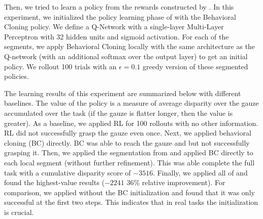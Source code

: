 Then, we tried to learn a policy from the rewards constructed by \hirl.
In this experiment, we initialized the policy learning phase of \hirl with the Behavioral Cloning policy.
We define a Q-Network with a single-layer Multi-Layer Perceptron with 32 hidden units and sigmoid activation.
For each of the segments, we apply Behavioral Cloning locally with the same architecture as the Q-network (with an additional softmax over the output layer) to get an initial policy. We rollout 100 trials with an $\epsilon=0.1$ greedy version of these segmented policies.


The learning results of this experiment are summarized below with different baselines.
The value of the policy is a measure of average disparity over the gauze accumulated over the task (if the gauze is flatter longer, then the value is greater).
As a baseline, we applied RL for 100 rollouts with no other information. RL did not successfully grasp the gauze even once.
Next, we applied behavioral cloning (BC) directly.
BC was able to reach the gauze and but not successfully grasping it.
Then, we applied the segmentation from \hirl  and applied BC directly to each local segment (without further refinement). 
This was able complete the full task with a cumulative disparity score of $-3516$.
Finally, we applied all of \hirl and found the highest-value results ($-2241$ 36\% relative improvement).
For comparison, we applied \hirl without the BC initialization and found that it was only successful at the first two steps.
This indicates that in real tasks the initialization is crucial.

